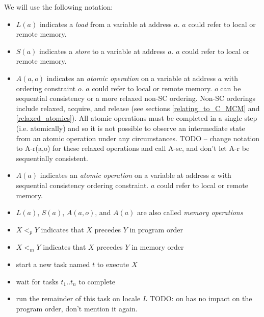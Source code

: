 We will use the following notation:
\begin{itemize}

  \item $L(a)$ indicates a \textit{load} from a variable at address $a$.
  $a$ could refer to local or remote memory.

  \item $S(a)$ indicates a \textit{store} to a variable at address $a$.
  $a$ could refer to local or remote memory.

  \item $A(a,o)$ indicates an \textit{atomic operation} on a variable at
  address $a$ with ordering constraint $o$. $a$ could refer to local or
  remote memory.  $o$ can be sequential consistency or a more relaxed
  non-SC ordering.  Non-SC orderings include relaxed, acquire, and release
  (see sections \ref{relating_to_C_MCM} and \ref{relaxed_atomics}). All
  atomic operations must be completed in a single step (i.e. atomically)
  and so it is not possible to observe an intermediate state from an
  atomic operation under any circumstances. TODO -- change notation to
  A-r(a,o) for these relaxed operations and call A-sc, and don't let A-r
  be sequentially consistent.

  \item $A(a)$ indicates an \textit{atomic operation} on a variable at
  address $a$ with sequential consistency ordering constraint. $a$ could
  refer to local or remote memory.

  \item $L(a)$, $S(a)$, $A(a,o)$, and $A(a)$ are also called
  \textit{memory operations}

  \item $X <_p Y$ indicates that $X$ precedes $Y$ in program order

  \item $X <_m Y$ indicates that $X$ precedes $Y$ in memory order

  \item {} start a new task named $t$ to execute $X$

  \item {} wait for tasks $t_1..t_n$ to complete

  \item {} run the remainder of this task on locale $L$
   TODO: on has no impact on the program order, don't mention it again.

\end{itemize}

